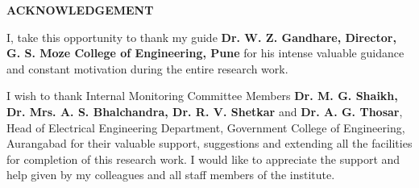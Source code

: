 %
%
%
%
%


\begin{center}
\large \textbf{ACKNOWLEDGEMENT}
\end{center}

\setlength{\parskip}{1em}
\justify \normalsize I, take this opportunity to thank my guide \textbf{Dr. W. Z. Gandhare, Director, G. S. Moze College of Engineering, Pune} for his intense valuable guidance and constant motivation during the entire research work.

I wish to thank Internal Monitoring Committee Members \textbf{Dr. M. G. Shaikh, Dr. Mrs. A. S. Bhalchandra, Dr. R. V. Shetkar} and \textbf{Dr. A. G. Thosar}, Head of Electrical Engineering Department, Government College of Engineering, Aurangabad for their valuable support, suggestions and extending all the facilities for completion of this research work. I would like to appreciate the support and help given by my colleagues and all staff members of the institute.

